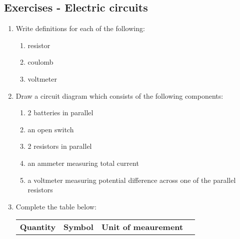             \subsection{ Exercises - Electric circuits}
            \nopagebreak
      \label{m38776*id68040}\begin{enumerate}[noitemsep, label=\textbf{\arabic*}. ] 
            \label{m38776*uid79}\item  Write definitions for each of the following:
\label{m38776*id68056}\begin{enumerate}[noitemsep, label=\textbf{\alph*}. ] 
            \label{m38776*uid80}\item resistor
\label{m38776*uid81}\item coulomb
\label{m38776*uid82}\item voltmeter
\end{enumerate}
                  \label{m38776*uid83}\item  Draw a circuit diagram which consists of the following components:
\label{m38776*id68109}\begin{enumerate}[noitemsep, label=\textbf{\alph*}. ] 
            \label{m38776*uid84}\item 2 batteries in parallel
\label{m38776*uid85}\item an open switch
\label{m38776*uid86}\item 2 resistors in parallel
\label{m38776*uid87}\item an ammeter measuring total current
\label{m38776*uid88}\item a voltmeter measuring potential difference across one of the parallel resistors
\end{enumerate}
                  \label{m38776*uid89}\item  Complete the table below:
          \begin{table}[H]
        \begin{center}
      \label{m38776*id68187}
    \noindent
      \tablelasttail{}
      \begin{xtabular}[t]{|l|l|l|l|}\hline
        \textbf{Quantity} &
        \textbf{Symbol} &
        \textbf{Unit of meaurement} &

\end{xtabular}
\end{center}
\end{table}
\end{enumerate}
